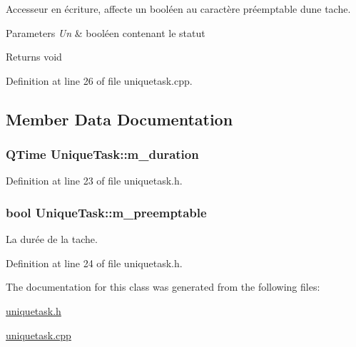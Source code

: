 Accesseur en écriture, affecte un booléen au caractère préemptable d\textquotesingle{}une tache. 


\begin{DoxyParams}{Parameters}
{\em Un} & booléen contenant le statut \\
\hline
\end{DoxyParams}
\begin{DoxyReturn}{Returns}
void 
\end{DoxyReturn}


Definition at line 26 of file uniquetask.\+cpp.



\subsection{Member Data Documentation}
\hypertarget{class_unique_task_a8d7fa1559a22ca019cc353354f5e7094}{}
\subsubsection[{m\+\_\+duration}]{\setlength{\rightskip}{0pt plus 5cm}Q\+Time Unique\+Task\+::m\+\_\+duration\hspace{0.3cm}{\ttfamily [protected]}}\label{class_unique_task_a8d7fa1559a22ca019cc353354f5e7094}


Definition at line 23 of file uniquetask.\+h.

\hypertarget{class_unique_task_a93fcfbd1a38642296ca7ac7919129bf4}{}
\subsubsection[{m\+\_\+preemptable}]{\setlength{\rightskip}{0pt plus 5cm}bool Unique\+Task\+::m\+\_\+preemptable\hspace{0.3cm}{\ttfamily [protected]}}\label{class_unique_task_a93fcfbd1a38642296ca7ac7919129bf4}


La durée de la tache. 



Definition at line 24 of file uniquetask.\+h.



The documentation for this class was generated from the following files\+:\begin{DoxyCompactItemize}
\item 
\hyperlink{uniquetask_8h}{uniquetask.\+h}\item 
\hyperlink{uniquetask_8cpp}{uniquetask.\+cpp}\end{DoxyCompactItemize}
